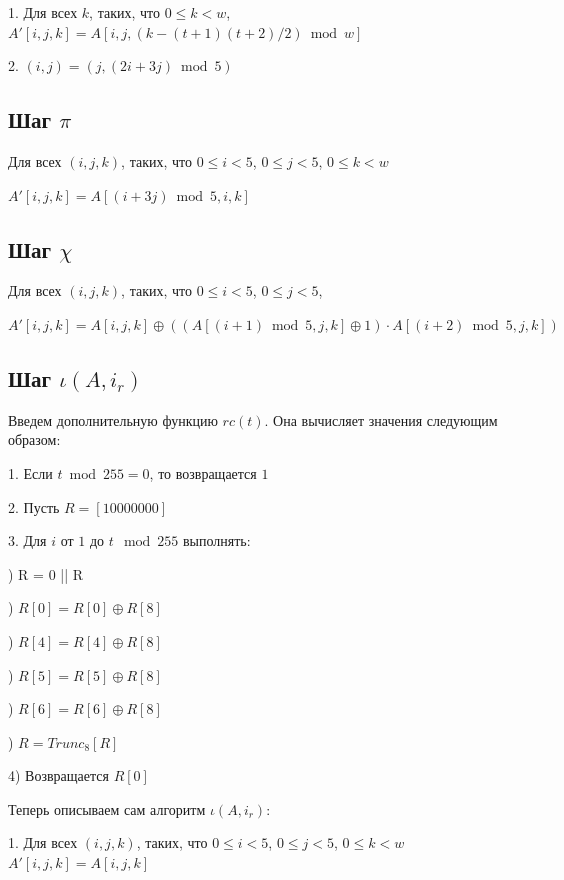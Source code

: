 \documentclass[a4paper,12pt]{article}
\theoremstyle{plain} %
\theoremstyle{definition} %
\theoremstyle{remark} %
\begin{document}
	1. Для всех $k$, таких, что 
	$0 \leqslant k < w$, $A'[i,j, k] = A[i, j, (k-(t+1)(t+2)/2) \bmod w]$
	
	2. $(i, j) = (j, (2i + 3j) \bmod 5)$
	
	\subsection{Шаг $\pi$}
	
	Для всех $(i, j, k)$, таких, что $0 \leqslant i < 5$, $0 \leqslant j < 5$, $0 \leqslant k < w$
	
	$A'[i,j,k] = A[(i + 3j) \bmod 5, i, k]$
	
	\subsection{Шаг $\chi$}
	
	Для всех $(i, j, k)$, таких, что $0 \leqslant i < 5$, $0 \leqslant j < 5$,
	
	$A'[i,j,k] = A[i,j,k] \oplus ((A[(i+1) \bmod 5, j, k] \oplus 1) \cdot A[(i+2) \bmod 5, j, k])$
	
	\subsection{Шаг $\iota(A,i_r)$}
	
	Введем дополнительную функцию $rc(t)$. Она вычисляет значения следующим образом:
	
	1. Если $t \bmod 255 = 0$, то возвращается $1$
	
	2. Пусть $R = [1  0  0  0  0  0  0  0]$
	
	3.  Для $i$ от $1$ до $t\mod 255$ выполнять:
	
) R = 0 || R
	
) $R[0] = R[0] \oplus R[8]$
	
) $R[4] = R[4] \oplus R[8]$
	
) $R[5] = R[5] \oplus R[8]$
	
) $R[6] = R[6] \oplus R[8]$
	
) $R = Trunc_8[R]$
	
	4) Возвращается $R[0]$
	
	\newpage
	
	Теперь описываем сам алгоритм $\iota(A,i_r)$:
	
	1. Для всех $(i, j, k)$, таких, что $0 \leqslant i < 5$, $0 \leqslant j < 5$, $0 \leqslant k < w$ $A'[i,j,k] = A[i,j,k]$
	
\end{document}
